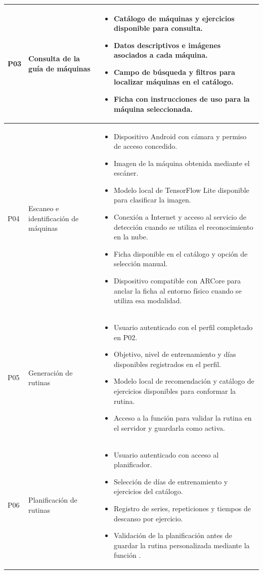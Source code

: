 {\begin{longtable}{|L{1.3cm}|L{3.3cm}|L{9cm}|}
P03 & Consulta de la guía de máquinas &
\begin{itemize}
    \item Catálogo de máquinas y ejercicios disponible para consulta.
    \item Datos descriptivos e imágenes asociados a cada máquina.
    \item Campo de búsqueda y filtros para localizar máquinas en el catálogo.
    \item Ficha con instrucciones de uso para la máquina seleccionada.
\end{itemize}
\\ \hline

P04 & Escaneo e identificación de máquinas &
\begin{itemize}
    \item Dispositivo Android con cámara y permiso de acceso concedido.
    \item Imagen de la máquina obtenida mediante el escáner.
    \item Modelo local de TensorFlow Lite disponible para clasificar la imagen.
    \item Conexión a Internet y acceso al servicio de detección cuando se
    utiliza el reconocimiento en la nube.
    \item Ficha disponible en el catálogo y opción de selección manual.
    \item Dispositivo compatible con ARCore para anclar la ficha al entorno
    físico cuando se utiliza esa modalidad.
\end{itemize}
\\ \hline

P05 & Generación de rutinas &
\begin{itemize}
    \item Usuario autenticado con el perfil completado en P02.
    \item Objetivo, nivel de entrenamiento y días disponibles registrados
    en el perfil.
    \item Modelo local de recomendación y catálogo de ejercicios disponibles
    para conformar la rutina.
    \item Acceso a la función  para validar la rutina
    en el servidor y guardarla como activa.
\end{itemize}
\\ \hline

P06 & Planificación de rutinas &
\begin{itemize}
    \item Usuario autenticado con acceso al planificador.
    \item Selección de días de entrenamiento y ejercicios del catálogo.
    \item Registro de series, repeticiones y tiempos de descanso por ejercicio.
    \item Validación de la planificación antes de guardar la rutina
    personalizada mediante la función .
\end{itemize}
\\ \hline


\end{longtable}}
